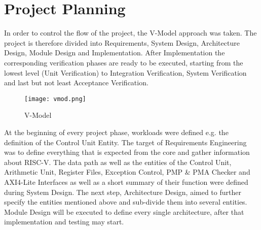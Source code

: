 
\chapter{Project Planning}
In order to control the flow of the project, the V-Model approach was taken. The
project is therefore divided into Requirements, System Design, Architecture Design,
Module Design and Implementation. After Implementation the corresponding
verification phases are ready to be executed, starting from the lowest level (Unit
Verification) to Integration Verification, System Verification and last but not least
Acceptance Verification.


\begin{figure}[h]
\centering
\texttt{[image: vmod.png]}
\caption{V-Model}
\end{figure}

At the beginning of every project phase, workloads were defined e.g. the definition of
the Control Unit Entity. The target of Requirements Engineering was to define
everything that is expected from the core and gather information about RISC-V. The
data path as well as the entities of the Control Unit, Arithmetic Unit, Register Files,
Exception Control, \acs{PMP} \& \acs{PMA} Checker and AXI4-Lite Interfaces as well as a short
summary of their function were defined during System Design. The next step,
Architecture Design, aimed to further specify the entities mentioned above and
sub-divide them into several entities. Module Design will be executed to define every
single architecture, after that implementation and testing may start.
